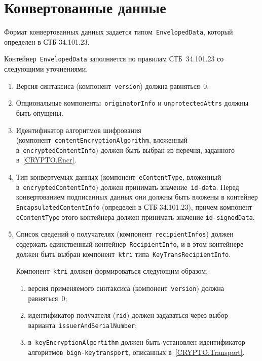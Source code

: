 \section{Конвертованные данные}\label{FMT.EnvelopedData}

Формат конвертованных данных задается типом~\texttt{EnvelopedData}, который
определен в СТБ 34.101.23. 

Контейнер~\texttt{EnvelopedData} заполняется по правилам СТБ~34.101.23
со следующими уточнениями.

\begin{enumerate}
\item
Версия синтаксиса (компонент~\texttt{version}) должна равняться~$0$. 

\item
Опциональные компоненты~\texttt{originatorInfo} и 
\texttt{unprotectedAttrs} должны быть опущены. 

\item
Идентификатор алгоритмов шифрования 
(компонент~\texttt{contentEncryptionAlgorithm}, вложенный  
в~\texttt{encryptedContentInfo}) должен быть выбран из перечня, 
заданного в~\ref{CRYPTO.Encr}.

\item
Тип конвертуемых данных (компонент~\texttt{eContentType}, вложенный 
в~\texttt{encryptedContentInfo}) должен принимать значение~\texttt{id-data}. 
Перед конвертованием подписанных данных они должны быть вложены в контейнер 
\texttt{EncapsulatedContentInfo} (определен в СТБ 34.101.23), причем компонент 
\texttt{eContentType} этого контейнера должен принимать значение 
\texttt{id-signedData}.

\item
Список сведений о получателях (компонент~\texttt{recipientInfos})
должен содержать единственный контейнер~\texttt{RecipientInfo}, 
и в этом контейнере должен быть выбран компонент~\texttt{ktri} 
типа~\texttt{KeyTransRecipientInfo}. 

Компонент~\texttt{ktri} должен формироваться следующим образом:
\begin{enumerate}
\item
версия применяемого синтаксиса (компонент~\texttt{version})
должна равняться~$0$;
\item
идентификатор получателя (\texttt{rid}) должен задаваться через выбор 
варианта~\texttt{issuerAndSerialNumber};
\item
в~\texttt{keyEncryptionAlgortithm} должен быть установлен идентификатор
алгоритмов~\texttt{bign-keytransport}, описанных в~\ref{CRYPTO.Transport}.
\end{enumerate}
\end{enumerate}